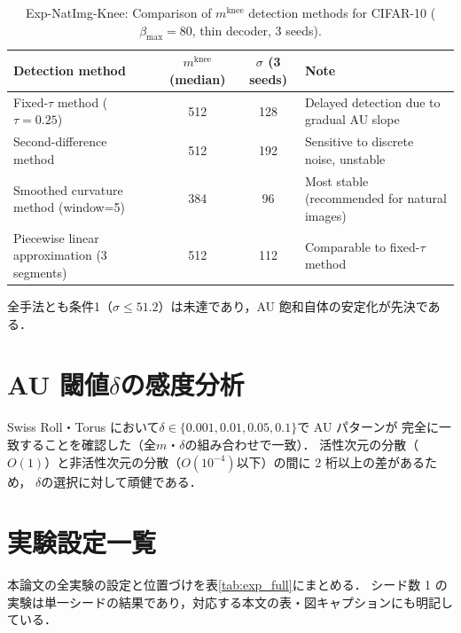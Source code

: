 \documentclass[11pt,a4paper]{jsarticle}
\newcommand{\mknee}{m^{\mathrm{knee}}}
\begin{document}
\begin{table}[H]
\centering
\caption{Exp-NatImg-Knee: Comparison of $\mknee$ detection methods for CIFAR-10 ($\beta_\mathrm{max}=80$, thin decoder, 3 seeds).}
\label{tab:natimg_knee}
\small
\begin{tabular}{p{4.2cm}ccp{4.6cm}}
\toprule
Detection method & $\mknee$ (median) & $\sigma$ (3 seeds) & Note \\
\midrule
Fixed-$\tau$ method ($\tau=0.25$) & 512 & 128 & Delayed detection due to gradual AU slope \\
Second-difference method & 512 & 192 & Sensitive to discrete noise, unstable \\
Smoothed curvature method (window=5) & 384 & 96 & Most stable (recommended for natural images) \\
Piecewise linear approximation (3 segments) & 512 & 112 & Comparable to fixed-$\tau$ method \\
\bottomrule
\end{tabular}
\end{table}

全手法とも条件1（$\sigma \leq 51.2$）は未達であり，AU 飽和自体の安定化が先決である．

\section{AU 閾値$\delta$の感度分析}\label{app:delta}

Swiss Roll・Torus において$\delta \in \{0.001, 0.01, 0.05, 0.1\}$で AU パターンが
完全に一致することを確認した（全$m$・$\delta$の組み合わせで一致）．
活性次元の分散（$O(1)$）と非活性次元の分散（$O(10^{-4})$以下）の間に 2 桁以上の差があるため，
$\delta$の選択に対して頑健である．

\section{実験設定一覧}\label{app:exp_table}

本論文の全実験の設定と位置づけを表\ref{tab:exp_full}にまとめる．
シード数 1 の実験は単一シードの結果であり，対応する本文の表・図キャプションにも明記している．
\end{document}
